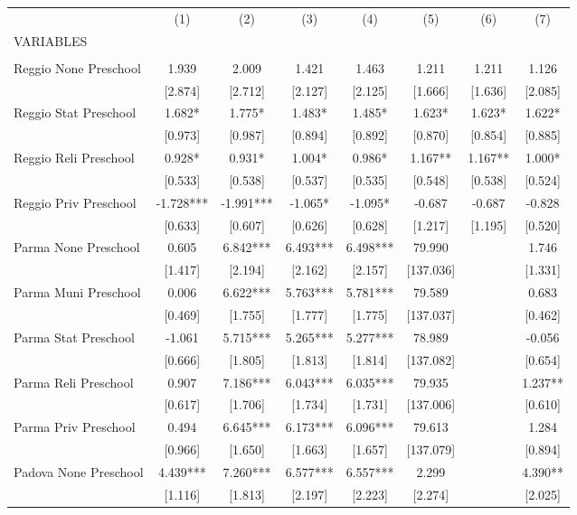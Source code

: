 \begin{tabular}{lccccccc} \hline
 & (1) & (2) & (3) & (4) & (5) & (6) & (7) \\
VARIABLES &  &  &  &  &  &  &  \\ \hline
 &  &  &  &  &  &  &  \\
Reggio None Preschool & 1.939 & 2.009 & 1.421 & 1.463 & 1.211 & 1.211 & 1.126 \\
 & [2.874] & [2.712] & [2.127] & [2.125] & [1.666] & [1.636] & [2.085] \\
Reggio Stat Preschool & 1.682* & 1.775* & 1.483* & 1.485* & 1.623* & 1.623* & 1.622* \\
 & [0.973] & [0.987] & [0.894] & [0.892] & [0.870] & [0.854] & [0.885] \\
Reggio Reli Preschool & 0.928* & 0.931* & 1.004* & 0.986* & 1.167** & 1.167** & 1.000* \\
 & [0.533] & [0.538] & [0.537] & [0.535] & [0.548] & [0.538] & [0.524] \\
Reggio Priv Preschool & -1.728*** & -1.991*** & -1.065* & -1.095* & -0.687 & -0.687 & -0.828 \\
 & [0.633] & [0.607] & [0.626] & [0.628] & [1.217] & [1.195] & [0.520] \\
Parma None Preschool & 0.605 & 6.842*** & 6.493*** & 6.498*** & 79.990 &  & 1.746 \\
 & [1.417] & [2.194] & [2.162] & [2.157] & [137.036] &  & [1.331] \\
Parma Muni Preschool & 0.006 & 6.622*** & 5.763*** & 5.781*** & 79.589 &  & 0.683 \\
 & [0.469] & [1.755] & [1.777] & [1.775] & [137.037] &  & [0.462] \\
Parma Stat Preschool & -1.061 & 5.715*** & 5.265*** & 5.277*** & 78.989 &  & -0.056 \\
 & [0.666] & [1.805] & [1.813] & [1.814] & [137.082] &  & [0.654] \\
Parma Reli Preschool & 0.907 & 7.186*** & 6.043*** & 6.035*** & 79.935 &  & 1.237** \\
 & [0.617] & [1.706] & [1.734] & [1.731] & [137.006] &  & [0.610] \\
Parma Priv Preschool & 0.494 & 6.645*** & 6.173*** & 6.096*** & 79.613 &  & 1.284 \\
 & [0.966] & [1.650] & [1.663] & [1.657] & [137.079] &  & [0.894] \\
Padova None Preschool & 4.439*** & 7.260*** & 6.577*** & 6.557*** & 2.299 &  & 4.390** \\
 & [1.116] & [1.813] & [2.197] & [2.223] & [2.274] &  & [2.025] \\

\end{tabular}
